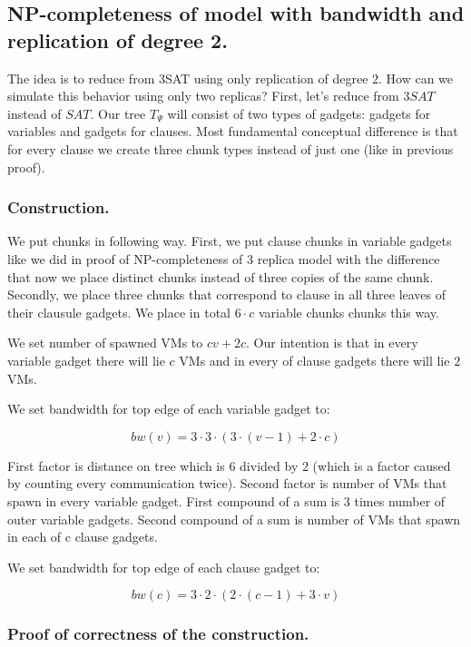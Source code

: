\subsection{NP-completeness of model with bandwidth and replication of
  degree 2.
}


The idea is to reduce from 3SAT using only replication of degree
$2$. How can we simulate this behavior using only two replicas? First,
let's reduce from $3SAT$ instead of $SAT$. Our tree $T_{\Psi}$
will consist of two types of gadgets: gadgets for variables and
gadgets for clauses. Most fundamental conceptual difference is that
for every clause we create three chunk types instead of just one (like
in previous proof). 

\subsubsection{Construction.}

We put chunks in following way. First, we put clause chunks in
variable gadgets like we did in proof of NP-completeness of 3 replica
model with the difference that now we place distinct chunks instead of
three copies of the same chunk.  Secondly, we place three chunks that
correspond to clause in all three leaves of their clausule gadgets. We
place in total $6 \cdot c$ variable chunks chunks this way.

We set number of spawned VMs to $cv + 2c$. Our intention is that in
every variable gadget there will lie $c$ VMs and in every of clause
gadgets there will lie $2$ VMs.

We set bandwidth for top edge of each variable gadget to:

$$ bw(v) = 3  \cdot  3  \cdot  (3  \cdot  (v - 1) + 2  \cdot  c) $$


First factor is distance on tree which is 6 divided by 2 (which is a
factor caused by counting every communication twice). Second factor is
number of VMs that spawn in every variable gadget. First compound of a
sum is 3 times number of outer variable gadgets. Second compound of a
sum is number of VMs that spawn in each of c clause gadgets.

We set bandwidth for top edge of each clause gadget to:

$$ bw(c) = 3  \cdot  2  \cdot  (2  \cdot  (c - 1) + 3  \cdot  v) $$

\subsubsection{Proof of correctness of the construction.}

